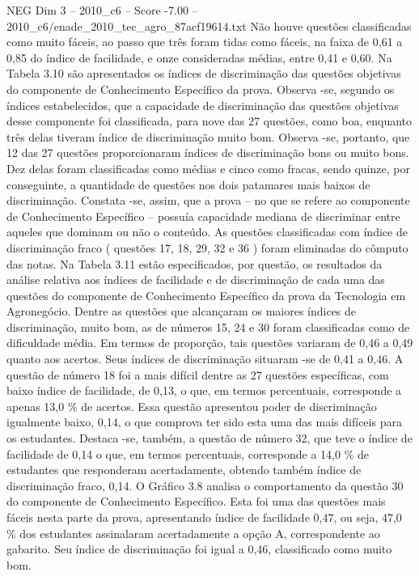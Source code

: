 \begin{textsample}{NEG Dim 3 – 2010\_c6 – Score -7.00 – 2010\_c6/enade\_2010\_tec\_agro\_87acf19614.txt}
Não houve questões classificadas como muito fáceis, ao passo que três foram tidas como fáceis, na faixa de 0,61 a 0,85 do índice de facilidade, e onze consideradas médias, entre 0,41 e 0,60.
Na Tabela 3.10 são apresentados os índices de discriminação das questões objetivas do componente de Conhecimento Específico da prova.
Observa -se, segundo os índices estabelecidos, que a capacidade de discriminação das questões objetivas desse componente foi classificada, para nove das 27 questões, como boa, enquanto três delas tiveram índice de discriminação muito bom.
Observa -se, portanto, que 12 das 27 questões proporcionaram índices de discriminação bons ou muito bons.
Dez delas foram classificadas como médias e cinco como fracas, sendo quinze, por conseguinte, a quantidade de questões nos dois patamares mais baixos de discriminação.
Constata -se, assim, que a prova – no que se refere ao componente de Conhecimento Específico – possuía capacidade mediana de discriminar entre aqueles que dominam ou não o conteúdo.
As questões classificadas com índice de discriminação fraco ( questões 17, 18, 29, 32 e 36 ) foram eliminadas do cômputo das notas.
Na Tabela 3.11 estão especificados, por questão, os resultados da análise relativa aos índices de facilidade e de discriminação de cada uma das questões do componente de Conhecimento Específico da prova da Tecnologia em Agronegócio.
Dentre as questões que alcançaram os maiores índices de discriminação, muito bom, as de números 15, 24 e 30 foram classificadas como de dificuldade média.
Em termos de proporção, tais questões variaram de 0,46 a 0,49 quanto aos acertos.
Seus índices de discriminação situaram -se de 0,41 a 0,46.
A questão de número 18 foi a mais difícil dentre as 27 questões específicas, com baixo índice de facilidade, de 0,13, o que, em termos percentuais, corresponde a apenas 13,0 \% de acertos.
Essa questão apresentou poder de discriminação igualmente baixo, 0,14, o que comprova ter sido esta uma das mais difíceis para os estudantes.
Destaca -se, também, a questão de número 32, que teve o índice de facilidade de 0,14 o que, em termos percentuais, corresponde a 14,0 \% de estudantes que responderam acertadamente, obtendo também índice de discriminação fraco, 0,14.
O Gráfico 3.8 analisa o comportamento da questão 30 do componente de Conhecimento Específico.
Esta foi uma das questões mais fáceis nesta parte da prova, apresentando índice de facilidade 0,47, ou seja, 47,0 \% dos estudantes assinalaram acertadamente a opção A, correspondente ao gabarito.
Seu índice de discriminação foi igual a 0,46, classificado como muito bom.

\end{textsample}
